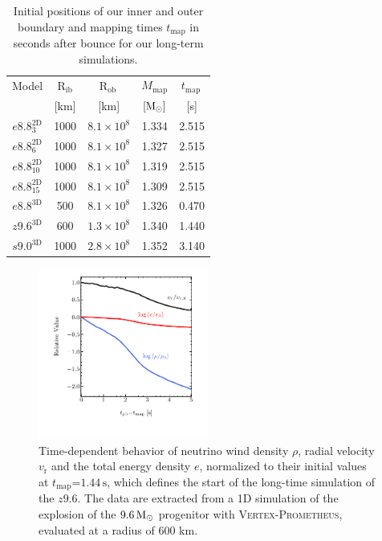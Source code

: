 \documentclass[fleqn,usenatbib]{mnras}
\newcommand{\solm}{\ensuremath{\rm{M_{\odot}}}\xspace}
\newcommand{\s}{\ensuremath{\text{s}}}
\newcommand{\vertexprom}{\textsc{Vertex-Prometheus}\xspace}
\newcommand{\GEO}[1]{{\color{red}#1}}
\begin{document}
\begin{table} %
 \centering
 \caption{Initial positions of our inner and outer boundary and mapping times $t_\mathrm{map}$ in seconds after bounce for our long-term simulations. }
\label{tab:long term boundaries}
\begin{tabular}{ccccc}
  \hline
 Model & $\mathrm{R_{ib}}$ & $\mathrm{R_{ob}\,}$ & $M_{\mathrm{map}}$ &  $t_{\mathrm{map}}\,$   \\
       & [km] & [km] & $[\solm]$ & [s]  \\
  \hline
 $e8.8^{\mathrm{2D}}_{3}$  & 1000 & $8.1\times10^{8}$ & 1.334 & 2.515 \\
 $e8.8^{\mathrm{2D}}_{6}$  & 1000 & $8.1\times10^{8}$ & 1.327 & 2.515 \\
 $e8.8^{\mathrm{2D}}_{10}$ & 1000 & $8.1\times10^{8}$ & 1.319 & 2.515 \\
 $e8.8^{\mathrm{2D}}_{15}$ & 1000 & $8.1\times10^{8}$ & 1.309 & 2.515 \\
 $e8.8^{\mathrm{3D}}$      & 500  & $8.1\times10^{8}$ & 1.326 & 0.470 \\
 $z9.6^{\mathrm{3D}}$      & 600  & $1.3\times10^{8}$ & 1.340 & 1.440 \\
 $s9.0^{\mathrm{3D}}$      & 1000  & $2.8\times10^{8}$ & 1.352 & 3.140 \\
  \hline
\end{tabular}
\end{table} %
\begin{figure} %
\label{fig:wind}
 \centering
 \includegraphics[width=0.50\textwidth,trim=0.2cm 1.2cm 0.2cm 0.2cm,clip]{./pic/wind_paper.pdf}
 \caption{\GEO{Time-dependent behavior of neutrino wind density $\rho$, radial velocity $v_{\mathrm{r}}$ and the total energy density $e$, normalized to their initial values at $t_{\mathrm{map}}\mathord{=}1.44\,\s$, which defines the start of the long-time simulation of the $z9.6$. The data are extracted from a 1D simulation of the explosion of the $9.6\,\solm$ progenitor with \vertexprom \citep{Mirizzi2016}, evaluated at a radius of 600 km.} }
\end{figure}%
\end{document}
